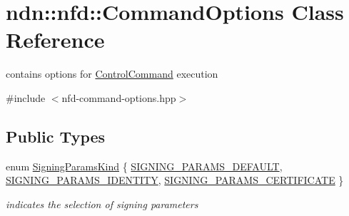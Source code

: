 \hypertarget{classndn_1_1nfd_1_1CommandOptions}{}\section{ndn\+:\+:nfd\+:\+:Command\+Options Class Reference}
\label{classndn_1_1nfd_1_1CommandOptions}


contains options for \hyperlink{classndn_1_1nfd_1_1ControlCommand}{Control\+Command} execution  




{\ttfamily \#include $<$nfd-\/command-\/options.\+hpp$>$}

\subsection*{Public Types}
\begin{DoxyCompactItemize}
\item 
enum \hyperlink{classndn_1_1nfd_1_1CommandOptions_a8ff10b025de45d0451470ccf83af5594}{Signing\+Params\+Kind} \{ \hyperlink{classndn_1_1nfd_1_1CommandOptions_a8ff10b025de45d0451470ccf83af5594a3a2eaec02899dccbe1ba79d586dd49f5}{S\+I\+G\+N\+I\+N\+G\+\_\+\+P\+A\+R\+A\+M\+S\+\_\+\+D\+E\+F\+A\+U\+LT}, 
\hyperlink{classndn_1_1nfd_1_1CommandOptions_a8ff10b025de45d0451470ccf83af5594a4526402da9c586bc63c8cc5b5f86e615}{S\+I\+G\+N\+I\+N\+G\+\_\+\+P\+A\+R\+A\+M\+S\+\_\+\+I\+D\+E\+N\+T\+I\+TY}, 
\hyperlink{classndn_1_1nfd_1_1CommandOptions_a8ff10b025de45d0451470ccf83af5594abab1ec30c4a99657b0791742d01f2bda}{S\+I\+G\+N\+I\+N\+G\+\_\+\+P\+A\+R\+A\+M\+S\+\_\+\+C\+E\+R\+T\+I\+F\+I\+C\+A\+TE}
 \}\begin{DoxyCompactList}\small\item\em indicates the selection of signing parameters \end{DoxyCompactList}
\end{DoxyCompactItemize}
